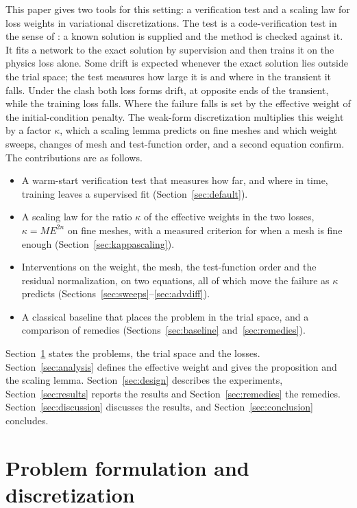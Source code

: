 \documentclass[a4paper,fleqn]{cas-sc}
\begin{document}
This paper gives two tools for this setting: a verification test and a scaling law for loss weights in variational
discretizations. The test is a code-verification test in the sense of \cite{roache1998,oberkampf2010}: a known solution is supplied
and the method is checked against it. It fits a network to the exact solution by supervision and then trains it on the
physics loss alone. Some drift is expected whenever the exact solution lies outside the trial space; the test measures how large it is
and where in the transient it falls. Under the clash both loss forms drift, at opposite ends of the transient, while the
training loss falls. Where the failure falls is set by the effective weight of the initial-condition penalty. The
weak-form discretization multiplies this weight by a factor $\kappa$, which a scaling lemma predicts on fine meshes and
which weight sweeps, changes of mesh and test-function order, and a second equation confirm. The contributions are as
follows.
\begin{itemize}
\item A warm-start verification test that measures how far, and where in time, training leaves a supervised fit
(Section~\ref{sec:default}).
\item A scaling law for the ratio $\kappa$ of the effective weights in the two losses, $\kappa=ME^{2n}$ on fine meshes, with
a measured criterion for when a mesh is fine enough (Section~\ref{sec:kappascaling}).
\item Interventions on the weight, the mesh, the test-function order and the residual normalization, on two equations,
all of which move the failure as $\kappa$ predicts (Sections~\ref{sec:sweeps}--\ref{sec:advdiff}).
\item A classical baseline that places the problem in the trial space, and a comparison of remedies
(Sections~\ref{sec:baseline} and~\ref{sec:remedies}).
\end{itemize}

Section~\ref{sec:formulation} states the problems, the trial space and the losses. Section~\ref{sec:analysis} defines
the effective weight and gives the proposition and the scaling lemma. Section~\ref{sec:design} describes the experiments,
Section~\ref{sec:results} reports the results and Section~\ref{sec:remedies} the remedies. Section~\ref{sec:discussion}
discusses the results, and Section~\ref{sec:conclusion} concludes.

\section{Problem formulation and discretization}
\label{sec:formulation}
\end{document}
